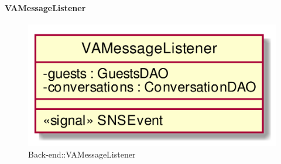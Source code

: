 \hypertarget{VAMessageListener_label}{\paragraph{VAMessageListener}}
\begin{figure}[h]
	\centering
	\includegraphics[width=\textwidth,height=\textheight,keepaspectratio]{images/ClassVAMessageListener.png}
	\caption{Back-end::VAMessageListener}
\end{figure}

